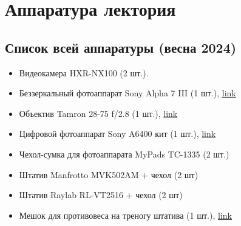 \section{Аппаратура лектория}\label{sec:lectory-equipment}

\subsection{Список всей аппаратуры (весна 2024)}\label{ssec:list-lectory-equipment}


\begin{itemize}[noitemsep]
  \item Видеокамера \textsf{HXR-NX100} (2 шт.).
  \item Беззеркальный фотоаппарат \textsf{Sony Alpha 7 III} (1 шт.), \href{https://www.dns-shop.ru/product/072f7a181f95ed20/bezzerkalnyj-fotoapparat-sony-alpha-7-iii-ilce-7m3-body-cernyj/?utm_medium=organic&utm_source=google&utm_referrer=https%3A%2F%2Fwww.google.com%2F}{link}
  \item Объектив \textsf{Tamron 28-75 f/2.8} (1 шт.), \href{https://market.yandex.ru/product--28-75mm-f-2-8-di-iii-vxd-g2-a063-sony-fe/1815178142?sku=101932837729&uniqueId=949986&do-waremd5=FH5qCCaCayJf1G2uHYFeAg}{link}
  \item Цифровой фотоаппарат \textsf{Sony A6400 кит} (1 шт.), \href{https://market.yandex.ru/product--alpha-ilce-6400-kit/421247398?sku=100616674751&uniqueId=892410&sponsored=1}{link}
  \item Чехол-сумка для фотоаппарата \textsf{MyPads TC-1335} (2 шт.)
  \item Штатив \textsf{Manfrotto MVK502AM} + чехол (2 шт)
  \item Штатив \textsf{Raylab RL-VT2516} + чехол (2 шт)
  \item Мешок для противовеса на треногу штатива (1 шт.), \href{https://www.ozon.ru/product/meshok-dlya-protivovesa-na-trenogu-shtativa-769963740/?asb=8pf%252Fu%252BR9J%252F0MwpX%252FMdg6zKRAYGZWdDesBOSTgX%252B%252BySE%253D&asb2=w3nj9ameRlr2ICqO15NVC3I6JbtCf0cZsgbqbvSIzWnrqtTuW8KdLdOPydeCvUxYhyvdoT2nJcss7vqlk0vj1A&avtc=1&avte=2&avts=1724448913&keywords=%D0%9C%D0%B5%D1%88%D0%BE%D0%BA++%D0%BD%D0%B0+%D1%82%D1%80%D0%B5%D0%BD%D0%BE%D0%B3%D1%83+%D1%88%D1%82%D0%B0%D1%82%D0%B8%D0%B2%D0%B0&tab=reviews}{link}

\end{itemize}
